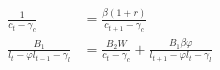   \begin{align}
    \frac{1}{c_t -\gamma_c} &=\frac{\beta(1+r)}{c_{t+1}-\gamma_c} \label{eq:sg_euler_c} \\
    \frac{B_1}{l_t - \varphi l_{t-1} - \gamma_l} &= \frac{B_2 W}{c_t - \gamma_c} + \frac{B_1 \beta \varphi}{l_{t+1}-\varphi l_t - \gamma_l} \label{eq:sg_euler_l}
  \end{align}
